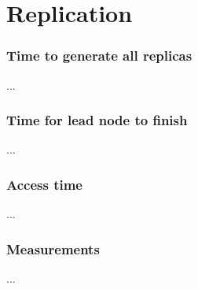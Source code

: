 \section{Replication}

\subsubsection*{Time to generate all replicas}
...

\subsubsection*{Time for lead node to finish}
...

\subsubsection*{Access time}
...

\subsubsection*{Measurements}
...